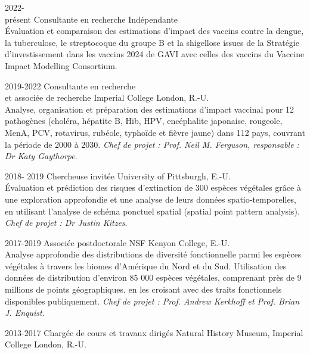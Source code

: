\documentclass[icon]{twentysecondcv}
\begin{document}
\begin{twenty} %


 \twentyitem
    	{2022- \\ présent}
    	{Consultante en recherche}
	{Indépendante}
        	{\\ \small Évaluation et comparaison des estimations d’impact des vaccins contre la dengue, la tuberculose, le streptocoque du groupe B et la shigellose issues de la Stratégie d’investissement dans les vaccins 2024 de GAVI avec celles des vaccins du Vaccine Impact Modelling Consortium.}
        	
	
 \twentyitem
       {2019-2022}
       {Consultante en recherche \\ et associée de recherche}
       {Imperial College London, R.-U.}
       {\\ \small Analyse, organisation et préparation des estimations d’impact vaccinal pour 12 pathogènes (choléra, hépatite B, Hib, HPV, encéphalite japonaise, rougeole, MenA, PCV, rotavirus, rubéole, typhoïde et fièvre jaune) dans 112 pays, couvrant la période de 2000 à 2030. \textit{Chef de projet : Prof. Neil M. Ferguson, responsable : Dr Katy Gaythorpe}.}
      
\twentyitem
    	{2018- 2019}
	{Chercheuse invitée}
        	{University of Pittsburgh, E.-U.}
        	{\\ \small Évaluation et prédiction des risques d’extinction de 300 espèces végétales grâce à une exploration approfondie et une analyse de leurs données spatio-temporelles, en utilisant l’analyse de schéma ponctuel spatial (spatial point pattern analysis).  \textit{Chef de projet : Dr Justin Kitzes}.}

	\twentyitem
    	{2017-2019}
	{Associée postdoctorale NSF}
        {Kenyon College, E.-U.}
        {\\ \small Analyse approfondie des distributions de diversité fonctionnelle parmi les espèces végétales à travers les biomes d’Amérique du Nord et du Sud. Utilisation des données de distribution d’environ 85 000 espèces végétales, comprenant près de 9 millions de points géographiques, en les croisant avec des traits fonctionnels disponibles publiquement. \textit{Chef de projet : Prof. Andrew Kerkhoff et  Prof. Brian J. Enquist}. }
      
    
    \twentyitem
	{2013-2017}
	{Chargée de cours et travaux dirigés}
	{Natural History Museum, Imperial College London, R.-U.}
	{}
\end{twenty}
\end{document}
